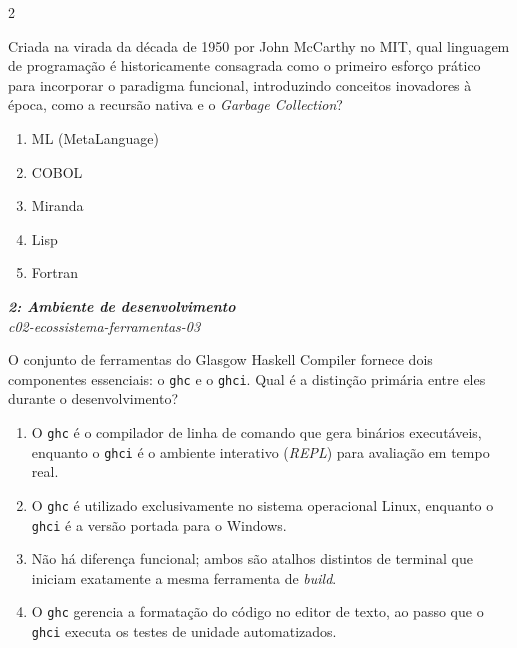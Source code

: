\documentclass[a4paper,10pt,brazil]{article}
\begin{document}
\begin{multicols}{2}
\begin{flushright}
\end{flushright}
Criada na virada da década de 1950 por John McCarthy no MIT, qual linguagem de programação é historicamente consagrada como o primeiro esforço prático para incorporar o paradigma funcional, introduzindo conceitos inovadores à época, como a recursão nativa e o \emph{Garbage Collection}?

\begin{enumerate}
  \item ML (MetaLanguage)

  \item COBOL

  \item Miranda

  \item Lisp

  \item Fortran


\end{enumerate}

\begin{flushright}
  \footnotesize
  \textit{\textbf{2: Ambiente de desenvolvimento}}\\
  \textit{c02-ecossistema-ferramentas-03}\\

\end{flushright}
O conjunto de ferramentas do Glasgow Haskell Compiler fornece dois componentes essenciais: o \texttt{ghc} e o \texttt{ghci}. Qual é a distinção primária entre eles durante o desenvolvimento?

\begin{enumerate}
  \item O \texttt{ghc} é o compilador de linha de comando que gera binários executáveis, enquanto o \texttt{ghci} é o ambiente interativo (\emph{REPL}) para avaliação em tempo real.

  \item O \texttt{ghc} é utilizado exclusivamente no sistema operacional Linux, enquanto o \texttt{ghci} é a versão portada para o Windows.

  \item Não há diferença funcional; ambos são atalhos distintos de terminal que iniciam exatamente a mesma ferramenta de \emph{build}.

  \item O \texttt{ghc} gerencia a formatação do código no editor de texto, ao passo que o \texttt{ghci} executa os testes de unidade automatizados.


\end{enumerate}
\end{multicols}
\end{document}
